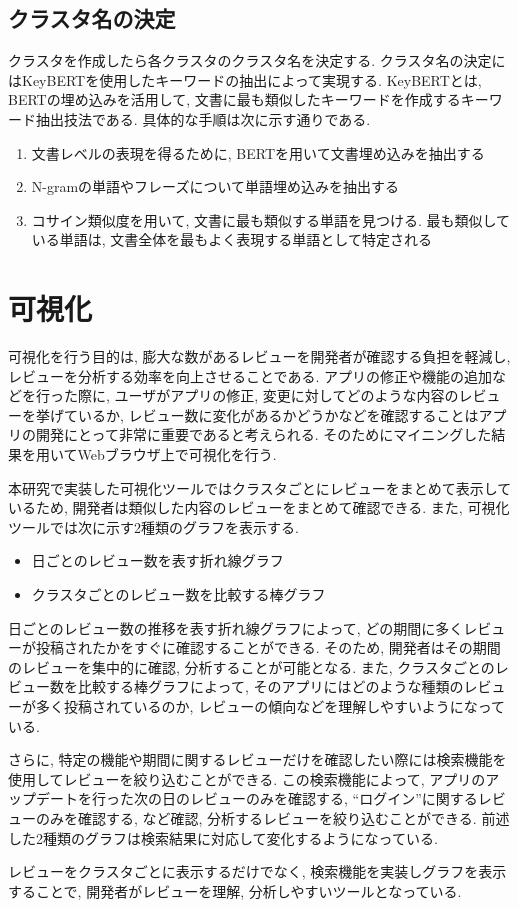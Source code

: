 \subsection{クラスタ名の決定}
クラスタを作成したら各クラスタのクラスタ名を決定する. 
クラスタ名の決定にはKeyBERT\cite{keybert}を使用したキーワードの抽出によって実現する. KeyBERTとは, BERTの埋め込みを活用して, 文書に最も類似したキーワードを作成するキーワード抽出技法である. 
具体的な手順は次に示す通りである. 

\begin{enumerate}
  \item 文書レベルの表現を得るために, BERTを用いて文書埋め込みを抽出する
  \item N-gramの単語やフレーズについて単語埋め込みを抽出する
  \item コサイン類似度を用いて, 文書に最も類似する単語を見つける. 最も類似している単語は, 文書全体を最もよく表現する単語として特定される
\end{enumerate}


\section{可視化}\label{visualization}
可視化を行う目的は, 膨大な数があるレビューを開発者が確認する負担を軽減し, レビューを分析する効率を向上させることである. 
アプリの修正や機能の追加などを行った際に, ユーザがアプリの修正, 変更に対してどのような内容のレビューを挙げているか, レビュー数に変化があるかどうかなどを確認することはアプリの開発にとって非常に重要であると考えられる. 
そのためにマイニングした結果を用いてWebブラウザ上で可視化を行う. 

本研究で実装した可視化ツールではクラスタごとにレビューをまとめて表示しているため, 開発者は類似した内容のレビューをまとめて確認できる. 
また, 可視化ツールでは次に示す2種類のグラフを表示する. 
\begin{itemize}
  \item 日ごとのレビュー数を表す折れ線グラフ
  \item クラスタごとのレビュー数を比較する棒グラフ
\end{itemize}
日ごとのレビュー数の推移を表す折れ線グラフによって, どの期間に多くレビューが投稿されたかをすぐに確認することができる. そのため, 開発者はその期間のレビューを集中的に確認, 分析することが可能となる. 
また, クラスタごとのレビュー数を比較する棒グラフによって, そのアプリにはどのような種類のレビューが多く投稿されているのか, レビューの傾向などを理解しやすいようになっている. 

さらに, 特定の機能や期間に関するレビューだけを確認したい際には検索機能を使用してレビューを絞り込むことができる. この検索機能によって, アプリのアップデートを行った次の日のレビューのみを確認する, ``ログイン''に関するレビューのみを確認する, など確認, 分析するレビューを絞り込むことができる. 
前述した2種類のグラフは検索結果に対応して変化するようになっている. 

レビューをクラスタごとに表示するだけでなく, 検索機能を実装しグラフを表示することで, 開発者がレビューを理解, 分析しやすいツールとなっている. 